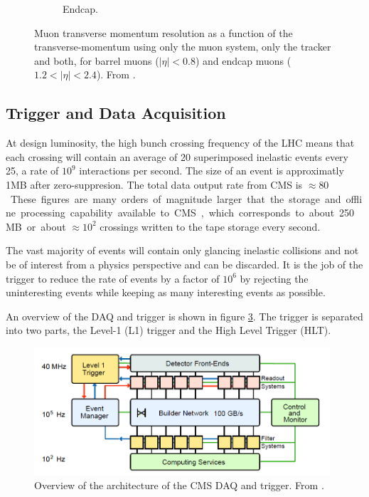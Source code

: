\begin{figure}[htbp]
\begin{subfigure}{0.48\textwidth}
    \caption{Endcap.}
    \label{fig:met_mean}
  \end{subfigure}
  \caption{Muon transverse momentum resolution as a function of the
  transverse-momentum using only the muon system, only the tracker and both, for
  barrel muons ($|\eta| < 0.8$) and endcap muons ($1.2<|\eta| < 2.4$). From
  \cite{cms}.} 
  \label{fig:muon_perfomance} 
\end{figure}

\subsection{Trigger and Data Acquisition}
At design luminosity, the high bunch crossing frequency of the LHC means that
each crossing will contain an average of 20 superimposed inelastic
events every \unit{25}{\nano\second}, a rate of $10^{9}$ interactions per
second.
The size of an event is approximatly \unit{1}{MB} after zero-suppresion.
The total data output rate from CMS is \unit{$\approx 80$}{\tera \bel \per
\second}.
These figures are many orders of magnitude larger that the storage and offline
processing capability available to CMS, which corresponds to about
\unit{250}{MB\per\second} or about $\approx 10^{2}$ crossings written to the tape
storage every second. 

The vast majority of events will contain only glancing inelastic collisions and
not be of interest from a physics perspective and can be discarded.  It is the
job of the trigger to reduce the rate of events by a factor of $10^6$ by
rejecting the uninteresting events while keeping as many interesting events as
possible.

An overview of the \ac{DAQ} and trigger is shown in figure \ref{fig:CMSDAQ}.
The trigger is separated into two parts, the Level-1 (L1) trigger and the High
Level Trigger (HLT).\cite{cms}

\begin{figure}[htbp]
  \centering
  \includegraphics[width=0.98\textwidth]{CMSDAQ}
  \caption{Overview of the architecture of the CMS DAQ and trigger. From
  \label{fig:CMSDAQ}
\cite{cms}.}
\end{figure}


